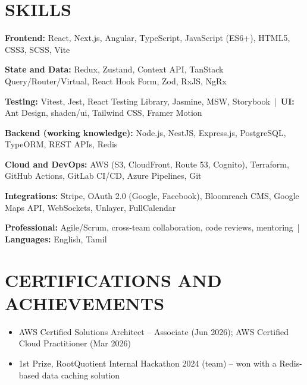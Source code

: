 \documentclass[10pt,a4paper]{article}
\begin{document}
\section*{SKILLS}
\textbf{Frontend:} React, Next.js, Angular, TypeScript, JavaScript (ES6+), HTML5, CSS3, SCSS, Vite\par\vspace{0.8pt}
\textbf{State and Data:} Redux, Zustand, Context API, TanStack Query/Router/Virtual, React Hook Form, Zod, RxJS, NgRx\par\vspace{0.8pt}
\textbf{Testing:} Vitest, Jest, React Testing Library, Jasmine, MSW, Storybook \,|\, \textbf{UI:} Ant Design, shadcn/ui, Tailwind CSS, Framer Motion\par\vspace{0.8pt}
\textbf{Backend (working knowledge):} Node.js, NestJS, Express.js, PostgreSQL, TypeORM, REST APIs, Redis\par\vspace{0.8pt}
\textbf{Cloud and DevOps:} AWS (S3, CloudFront, Route 53, Cognito), Terraform, GitHub Actions, GitLab CI/CD, Azure Pipelines, Git\par\vspace{0.8pt}
\textbf{Integrations:} Stripe, OAuth 2.0 (Google, Facebook), Bloomreach CMS, Google Maps API, WebSockets, Unlayer, FullCalendar\par\vspace{0.8pt}
\textbf{Professional:} Agile/Scrum, cross-team collaboration, code reviews, mentoring \,|\, \textbf{Languages:} English, Tamil\par

\section*{CERTIFICATIONS AND ACHIEVEMENTS}
\begin{itemize}
  \item AWS Certified Solutions Architect -- Associate (Jun 2026); AWS Certified Cloud Practitioner (Mar 2026)
  \item 1st Prize, RootQuotient Internal Hackathon 2024 (team) -- won with a Redis-based data caching solution
\end{itemize}
\end{document}
